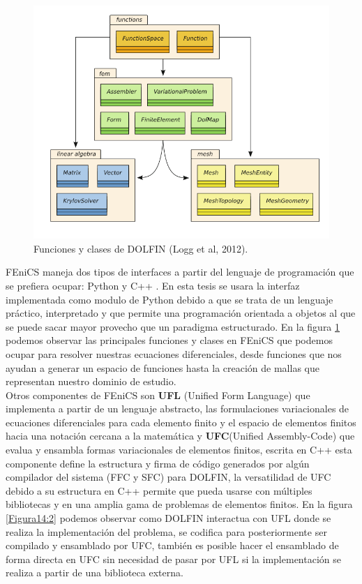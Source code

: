 \begin{figure}[ht!]
\centering
\includegraphics[scale=0.60]{Figura15.png}
\caption{ Funciones y clases de DOLFIN (Logg et al, 2012). }
\label{Figura15:2}
\end{figure}

FEniCS maneja dos tipos de interfaces a partir del lenguaje de programación que se prefiera ocupar: Python y C++ . En esta tesis se usara la interfaz implementada como modulo de Python  debido a que se trata de un lenguaje práctico, interpretado y que permite una programación orientada a objetos al que se puede sacar mayor provecho que un paradigma estructurado. En la figura \ref{Figura15:2} podemos observar las principales funciones y clases en FEniCS que podemos ocupar para resolver nuestras ecuaciones diferenciales, desde funciones que nos ayudan a generar un espacio de funciones hasta la creación de mallas que representan nuestro dominio de estudio.
\\

Otros componentes de FEniCS son \textbf{UFL} (Unified Form Language) que implementa a partir de un lenguaje abstracto, las formulaciones variacionales de ecuaciones diferenciales para cada elemento finito y el espacio de elementos finitos hacia una notación cercana a la matemática y \textbf{UFC}(Unified Assembly-Code) que evalua y ensambla formas variacionales de elementos finitos, escrita en C++ esta componente define la estructura y firma de código generados por algún compilador del sistema (FFC y SFC) para DOLFIN, la versatilidad de UFC debido a su estructura en C++ permite que pueda usarse con múltiples bibliotecas y en una amplia gama de problemas de elementos finitos. En la figura \ref{Figura14:2} podemos observar como DOLFIN interactua con UFL donde se realiza la implementación del problema, se codifica para posteriormente ser compilado y ensamblado por UFC, también es posible hacer el ensamblado de forma directa en UFC sin necesidad de pasar por UFL si la implementación se realiza a partir de una biblioteca externa.
\\

